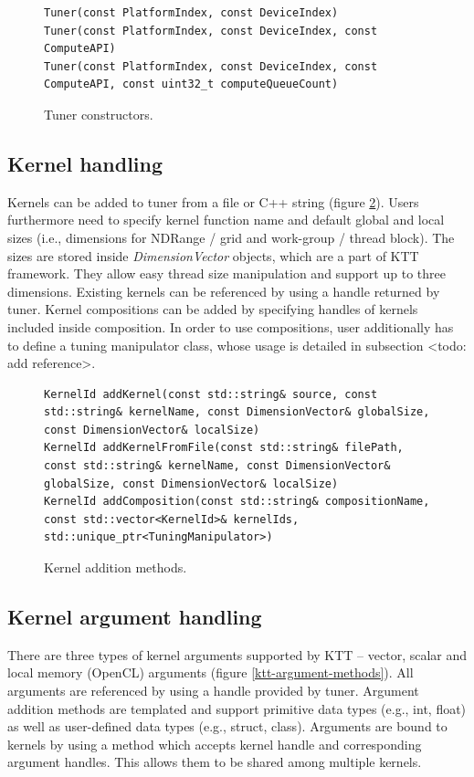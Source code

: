 \documentclass
[
    digital, %
    oneside, %
    table, %
    nolof, %
    nolot, %
    nocover %
]{fithesis3}
\begin{document}
\begin{figure}
\begin{lstlisting}
Tuner(const PlatformIndex, const DeviceIndex)
Tuner(const PlatformIndex, const DeviceIndex, const ComputeAPI)
Tuner(const PlatformIndex, const DeviceIndex, const ComputeAPI, const uint32_t computeQueueCount)
\end{lstlisting}
\caption{Tuner constructors.}
\label{ktt-constructors}
\end{figure}

\subsection{Kernel handling}
Kernels can be added to tuner from a file or C++ string (figure \ref{ktt-kernel-methods}). Users furthermore need to specify kernel function name and
default global and local sizes (i.e., dimensions for NDRange / grid and work-group / thread block). The sizes are stored inside \textit{DimensionVector}
objects, which are a part of KTT framework. They allow easy thread size manipulation and support up to three dimensions. Existing kernels can be
referenced by using a handle returned by tuner. Kernel compositions can be added by specifying handles of kernels included inside composition. In
order to use compositions, user additionally has to define a tuning manipulator class, whose usage is detailed in subsection <todo: add reference>.
\begin{figure}
\begin{lstlisting}
KernelId addKernel(const std::string& source, const std::string& kernelName, const DimensionVector& globalSize, const DimensionVector& localSize)
KernelId addKernelFromFile(const std::string& filePath, const std::string& kernelName, const DimensionVector& globalSize, const DimensionVector& localSize)
KernelId addComposition(const std::string& compositionName, const std::vector<KernelId>& kernelIds, std::unique_ptr<TuningManipulator>)
\end{lstlisting}
\caption{Kernel addition methods.}
\label{ktt-kernel-methods}
\end{figure}

\subsection{Kernel argument handling}
There are three types of kernel arguments supported by KTT -- vector, scalar and local memory (OpenCL) arguments (figure \ref{ktt-argument-methods}).
All arguments are referenced by using a handle provided by tuner. Argument addition methods are templated and support primitive data types (e.g.,
int, float) as well as user-defined data types (e.g., struct, class). Arguments are bound to kernels by using a method which accepts kernel handle
and corresponding argument handles. This allows them to be shared among multiple kernels.
\end{document}
